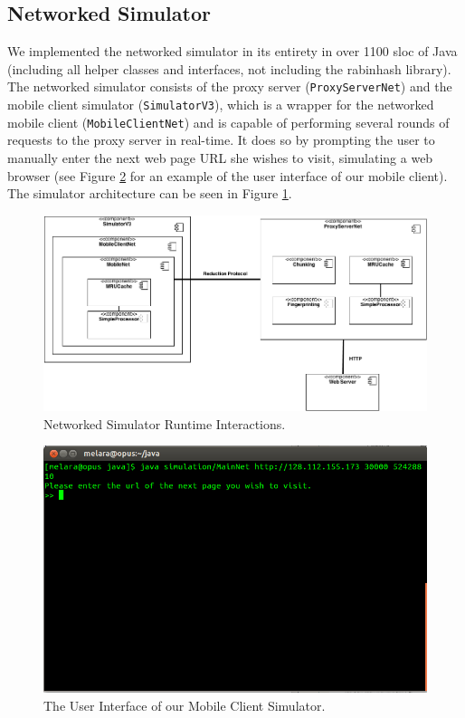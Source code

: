 \subsection{Networked Simulator}
\label{sec:netsim}
We implemented the networked simulator in its entirety in over 1100 sloc of Java (including all helper classes and interfaces, not including the rabinhash library). The networked simulator consists of the proxy server (\texttt{ProxyServerNet}) and the mobile client simulator (\texttt{SimulatorV3}), which is a wrapper for the networked mobile client (\texttt{MobileClientNet}) and is capable of performing several rounds of requests to the proxy server in real-time. It does so by prompting the user to manually enter the next web page URL she wishes to visit, simulating a web browser (see Figure \ref{fig:mobsim_ui} for an example of the user interface of our mobile client). The simulator architecture can be seen in Figure \ref{fig:netsim_arch}. 

\begin{figure}[ht] 
\centering \includegraphics[scale=0.40]{images/component_diagram.png}
\caption{Networked Simulator Runtime Interactions.}
\label{fig:netsim_arch}
\end{figure}

\begin{figure}[h] 
\centering \includegraphics[scale=0.40]{images/mobilesim_ui.png}
\caption{The User Interface of our Mobile Client Simulator.}
\label{fig:mobsim_ui}
\end{figure}

